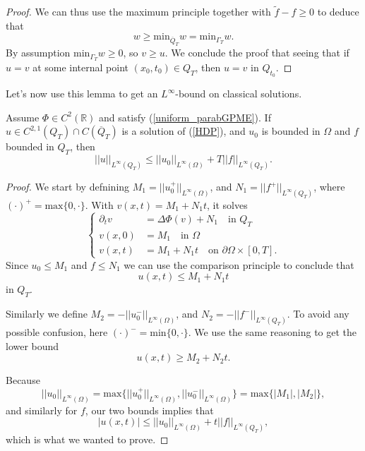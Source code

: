 \documentclass[11pt, a4paper]{article}
\begin{document}
\begin{proof}
We can thus use the maximum principle together with $\tilde{f}-f \geq 0$ to deduce that
\begin{equation*}
w \geq \mathrm{min}_{\overline{Q}_T}w = \mathrm{min}_{\Gamma_T}w.
\end{equation*}
By assumption $\mathrm{min}_{\Gamma_T}w \geq 0$, so $v \geq u$. We conclude the proof that seeing that if $u=v$ at some internal point $(x_0,t_0) \in Q_T$, then $u=v$ in $Q_{t_0}$.
\end{proof}


Let's now use this lemma to get an $L^\infty$-bound on classical solutions.
\begin{cor}
\label{cor:Linf_bound_classical}
Assume $\Phi \in C^2(\mathbb{R})$ and satisfy (\ref{uniform_parabGPME}). If $u \in C^{2,1}(Q_T)\cap C(\overline{Q}_T)$ is a solution of (\ref{HDP}), and $u_0$ is bounded in $\Omega$ and $f$ bounded in $Q_T$, then
	\begin{equation}
		\label{infinity_bound}
		||u||_{L^\infty(Q_T)} \leq ||u_0||_{L^\infty(\Omega)} + T||f||_{L^\infty(Q_T)}.
	\end{equation}
\end{cor}

\begin{proof}
We start by defnining $M_1 = ||u_0^+||_{L^\infty(\Omega)} $, and $N_1 = ||f^+||_{L^\infty(Q_T)}$, where $(\cdot)^+ = \mathrm{max} \{ 0,\cdot \}$. With $v(x,t) = M_1 + N_1t$, it solves
\begin{equation*}
\begin{cases}
	\partial_t v &= \Delta\Phi(v) +N_1 \quad \text{in } Q_T\\
	v(x,0) &= M_1 \quad \text{in } \Omega \\
	v(x,t) &= M_1 + N_1t \quad \text{on } \partial \Omega \times [0,T].
\end{cases}
\end{equation*}
Since $u_0 \leq M_1$ and $f\leq N_1$ we can use the comparison principle to conclude that
\begin{equation*}
u(x,t) \leq M_1 + N_1t
\end{equation*}
in $Q_T$.

Similarly we define $M_2 = -||u_0^-||_{L^\infty(\Omega)}$, and $N_2 = -||f^-||_{L^\infty(Q_T)}$. To avoid any possible confusion, here $(\cdot)^- = \mathrm{min}\{0, \cdot \}$. We use the same reasoning to get the lower bound
\begin{equation*}
u(x,t) \geq M_2 + N_2t.
\end{equation*}

Because
\begin{equation*}
||u_0||_{L^\infty(\Omega)} = \mathrm{max}\{ ||u_0^+||_{L^\infty(\Omega)}, ||u_0^-||_{L^\infty(\Omega)} \} = \mathrm{max}\{|M_1|,|M_2|\},
\end{equation*}
and similarly for $f$, our two bounds implies that
\begin{equation*}
|u(x,t)| \leq ||u_0||_{L^\infty(\Omega)} + t||f||_{L^\infty(Q_T)},
\end{equation*}
which  is what we wanted to prove.

\end{proof}
\end{document}
